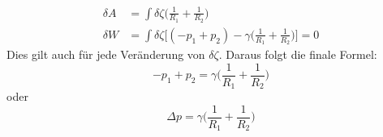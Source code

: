 \begin{refsection}
\begin{equation}
\begin{split}
\delta A &= \int \delta\zeta \bigg( \frac{1}{R_1}+\frac{1}{R_2} \bigg) \\
\delta W &= \int \delta\zeta \bigg[ (-p_1+p_2)-\gamma \bigg( \frac{1}{R_1}+\frac{1}{R_2} \bigg) \bigg] =0
\end{split}
\end{equation}
Dies gilt auch für jede Veränderung von $\delta\zeta$. Daraus folgt die finale Formel:
\begin{equation}
-p_1+p_2 = \gamma\bigg( \frac{1}{R_1}+\frac{1}{R_2} \bigg)
\end{equation}
oder
\begin{equation}\label{Young-Laplace}
\Delta p = \gamma\bigg( \frac{1}{R_1}+\frac{1}{R_2} \bigg)
\end{equation}


\printbibliography[heading=subbibliography]
\end{refsection}
